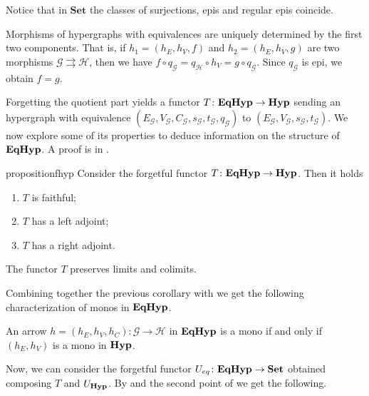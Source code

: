 \documentclass[a4paper,UKenglish,cleveref,pdftex,thm-restate,numberwithinsect]{lipics-v2021}
\newcommand{\eq}{\mathsf{eq}}
\newcommand{\Set}{\mathbf{Set}}
\newcommand{\catname}[1]{\textbf{\textup{#1}}}
\newcommand{\hyp}{\catname{Hyp}}
\newcommand{\EqHyp}{\catname{EqHyp}} %
\begin{document}
\begin{remark}
	Notice that in $\Set$ the classes of surjections, epis and regular epis coincide.
\end{remark}

\begin{remark}\label{rem:eqhyp_morphs}
	Morphisms of hypergraphs with equivalences are uniquely determined by the first two components. That is, if $h_1 = (h_E, h_V, f)$ and $h_2 = (h_E, h_V, g)$ are two morphisms $\mathcal{G} \rightrightarrows \mathcal{H}$, then we have
	$
	f \circ q_\mathcal{G} = q_\mathcal{H}\circ h_V =g\circ q_\mathcal{G}.
	$
	Since $q_\mathcal{G}$ is epi, we obtain $f = g$.
\end{remark}

Forgetting the quotient part yields a functor $T\colon \EqHyp \to \hyp$ sending an hypergraph with equivalence $(E_\mathcal{G}, V_{\mathcal{G}}, C_\mathcal{G}, s_\mathcal{G}, t_\mathcal{G}, q_\mathcal{G})$ to $(E_{\mathcal{G}}, V_{\mathcal{G}}, s_\mathcal{G}, t_{\mathcal{G}})$.   We now explore some of its properties to deduce information on the structure of $\EqHyp$.  
%
A proof is in .


\begin{restatable}{proposition}{fhyp}\label{prop:forghyp}  Consider the forgetful functor $T\colon \EqHyp \to \hyp$. Then it holds
	\begin{enumerate}
		\item$T$ is faithful;
		\item $T$ has a left adjoint;
		\item $T$ has a right adjoint.
	\end{enumerate}
\end{restatable}

\begin{corollary}\label{cor:limcolim}
	The functor $T$ preserves limits and colimits.
\end{corollary}

Combining together the previous corollary with  we get the following characterization of monos in $\EqHyp$.

\begin{corollary}\label{cor:mono1}
	An arrow $h = (h_E, h_V, h_C): \mathcal{G \to H}$ in $\EqHyp$ is a mono if and only if $(h_E, h_V)$ is a mono in $\hyp$.
\end{corollary}

Now, we can consider the forgetful functor $U_{\eq}\colon \EqHyp\to \Set$ obtained composing $T$ and $U_{\hyp}$.  By  and the second point of  we get the following.
\end{document}
